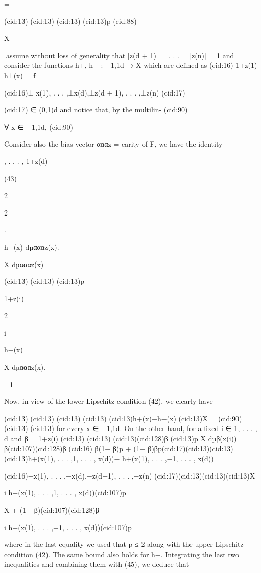 {=

(cid:13)
(cid:13)
(cid:13)
(cid:13)p
(cid:88)

X

assume without loss of generality that |z(d + 1)| = . . . = |z(n)| = 1 and consider the functions
h+, h− : {−1,1}d → X which are deﬁned as
(cid:16) 1+z(1)
h±(x) = f

(cid:16)± x(1), . . . ,±x(d),±z(d + 1), . . . ,±z(n)
(cid:17)

(cid:17) ∈ (0,1)d and notice that, by the multilin-
(cid:90)

∀ x ∈ {−1,1}d,
(cid:90)

Consider also the bias vector αααz =
earity of F, we have the identity

, . . . , 1+z(d)

(43)

2

2

.

h−(x) dµαααz(x).

X dµαααz(x)

(cid:13)
(cid:13)
(cid:13)p

1+z(i)

2

i

h−(x)

X dµαααz(x).

=1

Now, in view of the lower Lipschitz condition (42), we clearly have

(cid:13)
(cid:13)
(cid:13)
(cid:13)
(cid:13)h+(x)−h−(x)
(cid:13)X =
(cid:90)
(cid:13)
(cid:13)
for every x ∈ {−1,1}d. On the other hand, for a ﬁxed i ∈ {1, . . . , d} and β = 1+z(i)
(cid:13)
(cid:13)
(cid:13)(cid:128)β
(cid:13)p
X dµβ(x(i)) = β(cid:107)(cid:128)β
(cid:16)
β(1− β)p + (1− β)βp(cid:17)(cid:13)(cid:13)(cid:13)h+(x(1), . . . ,1, . . . , x(d))− h+(x(1), . . . ,−1, . . . , x(d))

(cid:16)−x(1), . . . ,−x(d),−z(d+1), . . . ,−z(n)
(cid:17)(cid:13)(cid:13)(cid:13)X

i h+(x(1), . . . ,1, . . . , x(d))(cid:107)p

X + (1− β)(cid:107)(cid:128)β

i h+(x(1), . . . ,−1, . . . , x(d))(cid:107)p

where in the last equality we used that p ≤ 2 along with the upper Lipschitz condition (42).
The same bound also holds for h−. Integrating the last two inequalities and combining them
with (45), we deduce that

}
